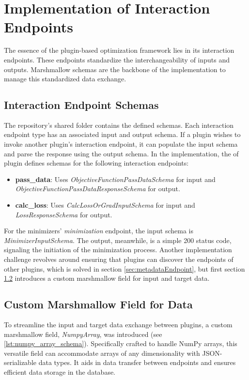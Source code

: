 \documentclass[
  a4paper,  %
  twoside,  %
  bibliography=totoc,
  headsepline,
  cleardoublepage=empty,
  parskip=half,
  draft=false
]{scrbook}
\begin{document}




\section{Implementation of Interaction Endpoints}
\label{sec:implementationOfInteractionEndpoints}

The essence of the plugin-based optimization framework lies in its interaction endpoints.
These endpoints standardize the interchangeability of inputs and outputs.
Marshmallow schemas are the backbone of the implementation to manage this standardized data exchange.

\subsection{Interaction Endpoint Schemas}
The repository's shared folder contains the defined schemas.
Each interaction endpoint type has an associated input and output schema.
If a plugin wishes to invoke another plugin's interaction endpoint, it can populate the input schema and parse the response using the output schema.
In the implementation, the \gls{of} plugin defines schemas for the following interaction endpoints:
\begin{itemize}
  \item \textbf{pass\_data}: Uses \emph{ObjectiveFunctionPassDataSchema} for input and \emph{ObjectiveFunctionPassDataResponseSchema} for output.
  \item \textbf{calc\_loss}: Uses \emph{CalcLossOrGradInputSchema} for input and \emph{LossResponseSchema} for output.
\end{itemize}
For the minimizers' \emph{minimization} endpoint, the input schema is \emph{MinimizerInputSchema}.
The output, meanwhile, is a simple 200 status code, signaling the initiation of the minimization process.
Another implementation challenge revolves around ensuring that plugins can discover the endpoints of other plugins, which is solved in section \ref{sec:metadataEndpoint}, but first section
\ref{sec:customMarshmallowFieldForData} introduces a custom marshmallow field for input and target data.

\subsection{Custom Marshmallow Field for Data}
\label{sec:customMarshmallowFieldForData}
To streamline the input and target data exchange between plugins, a custom marshmallow field, \emph{NumpyArray}, was introduced (see \ref{lst:numpy_array_schema}).
Specifically crafted to handle NumPy arrays, this versatile field can accommodate arrays of any dimensionality with JSON-serializable data types.
It aids in data transfer between endpoints and ensures efficient data storage in the database.

\end{document}
